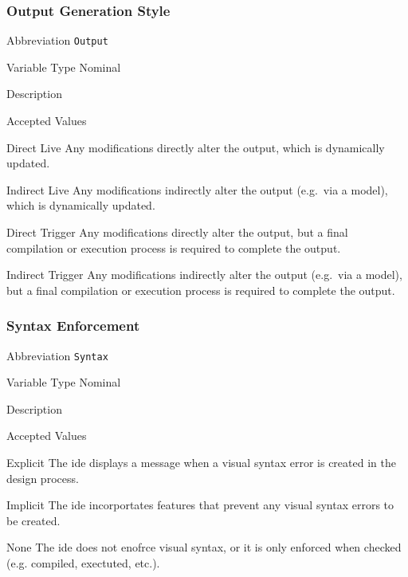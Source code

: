 \subsubsection{Output Generation Style}
\label{subsubsec:output}

\begin{AlignedDesc}
  \item[Abbreviation] \texttt{Output}

  \item[Variable Type] Nominal

  \item[Description] 

  \item[Accepted Values]

  \begin{AlignedDesc}
    \item[Direct Live] Any modifications directly alter the output, which
    is dynamically updated.
    \item[Indirect Live] Any modifications indirectly alter the output
    (e.g.\ via a model), which is dynamically updated.
    \item[Direct Trigger] Any modifications directly alter the output, but
    a final compilation or execution process is required to complete the
    output.
    \item[Indirect Trigger] Any modifications indirectly alter the output
    (e.g.\ via a model), but a final compilation or execution process is
    required to complete the output.
  \end{AlignedDesc}

\end{AlignedDesc}

\subsubsection{Syntax Enforcement}
\label{subsubsec:syntax}

\begin{AlignedDesc}
  \item[Abbreviation] \texttt{Syntax}

  \item[Variable Type] Nominal

  \item[Description]

  \item[Accepted Values]

  \begin{AlignedDesc}
    \item[Explicit] The \ac{ide} displays a message when a visual syntax error is created in the design process.
    \item[Implicit] The \ac{ide} incorportates features that prevent any visual syntax errors to be created.
    \item[None] The \ac{ide} does not enofrce visual syntax, or it is only enforced when checked (e.g. compiled, exectuted, etc.).
  \end{AlignedDesc}

\end{AlignedDesc}

